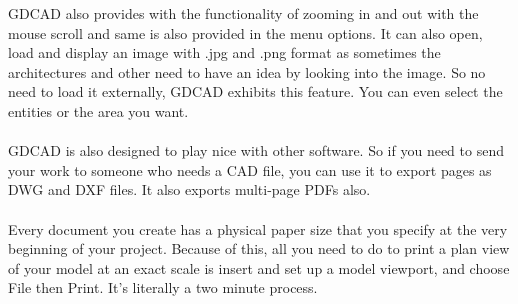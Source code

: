GDCAD also provides with the functionality of zooming in and out with the mouse scroll and same is also provided in the menu options.
It can also open, load and display an image with .jpg and .png format as sometimes the architectures and other need to have an idea by looking into the image. So no need to load it externally, GDCAD exhibits this feature. You can even select the entities or the area you want.\\\\
GDCAD is also designed to play nice with other software. So if you need to send your work to someone who needs a CAD file, you can use it to export pages as DWG and DXF files. It also exports multi-page PDFs also.\\\\
Every document you create has a physical paper size that you specify at the very beginning of your project. Because of this, all you need to do to print a plan view of your model at an exact scale is insert and set up a model viewport, and choose File then Print. It’s literally a two minute process.\\
